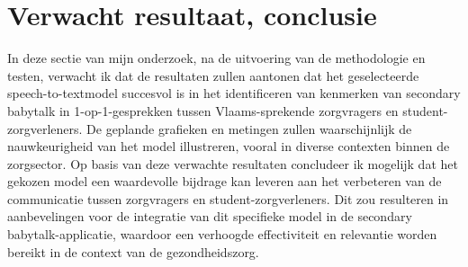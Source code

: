 \section{Verwacht resultaat, conclusie}%
\label{sec:verwachte_resultaten}
In deze sectie van mijn onderzoek, na de uitvoering van de methodologie en testen, verwacht ik dat de resultaten zullen aantonen dat het geselecteerde speech-to-textmodel succesvol is in het identificeren van kenmerken van secondary babytalk in 1-op-1-gesprekken tussen Vlaams-sprekende zorgvragers en student-zorgverleners. De geplande grafieken en metingen zullen waarschijnlijk de nauwkeurigheid van het model illustreren, vooral in diverse contexten binnen de zorgsector. Op basis van deze verwachte resultaten concludeer ik mogelijk dat het gekozen model een waardevolle bijdrage kan leveren aan het verbeteren van de communicatie tussen zorgvragers en student-zorgverleners. Dit zou resulteren in aanbevelingen voor de integratie van dit specifieke model in de secondary babytalk-applicatie, waardoor een verhoogde effectiviteit en relevantie worden bereikt in de context van de gezondheidszorg.

